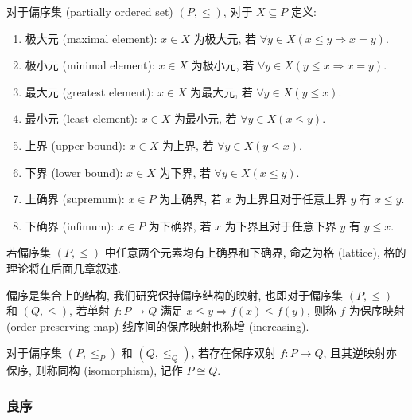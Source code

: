 \begin{definition}
    对于偏序集 (partially ordered set) \((P, \le)\), 对于 \(X \subseteq P\) 定义:
    \begin{enumerate}
        \item 极大元 (maximal element): \(x \in X\) 为极大元, 若 \(\forall y \in X (x \le y \Rightarrow x = y)\).
        \item 极小元 (minimal element): \(x \in X\) 为极小元, 若 \(\forall y \in X (y \le x \Rightarrow x = y)\).
        \item 最大元 (greatest element): \(x \in X\) 为最大元, 若 \(\forall y \in X (y \le x)\).
        \item 最小元 (least element): \(x \in X\) 为最小元, 若 \(\forall y \in X (x \le y)\).
        \item 上界 (upper bound): \(x \in X\) 为上界, 若 \(\forall y \in X (y \le x)\).
        \item 下界 (lower bound): \(x \in X\) 为下界, 若 \(\forall y \in X (x \le y)\).
        \item 上确界 (supremum): \(x \in P\) 为上确界, 若 \(x\) 为上界且对于任意上界 \(y\) 有 \(x \le y\).
        \item 下确界 (infimum): \(x \in P\) 为下确界, 若 \(x\) 为下界且对于任意下界 \(y\) 有 \(y \le x\).
    \end{enumerate}
\end{definition}

\begin{definition}
    若偏序集 \((P, \le)\) 中任意两个元素均有上确界和下确界, 命之为格 (lattice), 格的理论将在后面几章叙述.
\end{definition}

\begin{definition}
    偏序是集合上的结构, 我们研究保持偏序结构的映射, 也即对于偏序集 \((P, \le)\) 和 \((Q, \le)\),
    若单射 \(f : P \to Q\) 满足 \(x \le y \Rightarrow f(x) \le f(y)\), 则称 \(f\) 为保序映射 (order-preserving map)
    线序间的保序映射也称增 (increasing).
\end{definition}

\begin{definition}
    对于偏序集 \((P, \le_P)\) 和 \((Q, \le_Q)\), 若存在保序双射 \(f : P \to Q\), 且其逆映射亦保序, 则称同构 (isomorphism), 记作 \(P \cong Q\).
\end{definition}

\subsubsection{良序}

